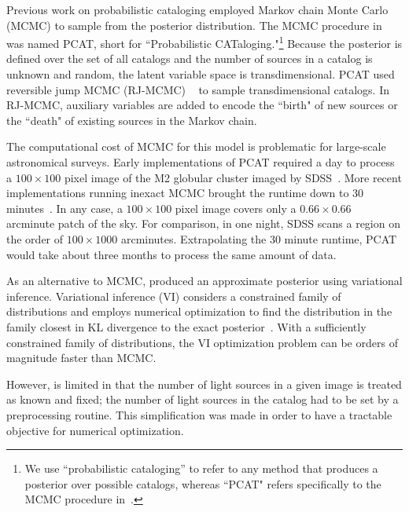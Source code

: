 Previous work on probabilistic cataloging employed Markov chain Monte Carlo (MCMC) to sample from the posterior distribution.
The MCMC procedure in~\cite{Portillo_2017, Feder_2019}
was named PCAT, short for ``Probabilistic CATaloging."\footnote{
We use ``probabilistic cataloging'' to refer to any method that produces a posterior over possible catalogs, whereas ``PCAT" refers specifically to the MCMC procedure in~\cite{Portillo_2017, Feder_2019}. }
Because the posterior is defined over the set of all catalogs and the number of sources in a catalog is unknown and random, 
the latent variable space is transdimensional. PCAT
used reversible jump MCMC (RJ-MCMC) ~\cite{Green95reversiblejump} to sample transdimensional catalogs. In RJ-MCMC, auxiliary variables are added to encode the ``birth" of new sources 
or the ``death" of existing sources in the Markov chain.

The computational cost of MCMC for this model is problematic for large-scale astronomical surveys. 
Early implementations of PCAT required a day to process a $100\times 100$ pixel image of the M2 globular cluster imaged by SDSS~\cite{Portillo_2017}. 
More recent implementations running inexact MCMC brought the runtime down to 30  minutes~\cite{Feder_2019}.  
In any case, a $100\times 100$ pixel image covers only a $0.66 \times 0.66$ arcminute patch of the sky.
For comparison, in one night, SDSS scans a region on the order of $100 \times 1000$ arcminutes. 
Extrapolating the 30 minute runtime, PCAT would take about three months to process the same amount of data.

As an alternative to MCMC, \cite{regier2019_celeste} produced an approximate posterior using variational inference.
Variational inference (VI) considers a constrained family of distributions and employs numerical optimization to find the distribution in the family closest
in KL divergence to the exact posterior~\cite{Blei_2017_vi_review,Jordan_intro_vi, Wainwrite_graph_models_vi}. 
With a sufficiently constrained family of distributions, the VI optimization problem can be orders of magnitude faster than MCMC. 

However, \cite{regier2019_celeste} is limited in that the number of light sources in a given image is treated as known and fixed; the number of light sources in the catalog had to be set by a preprocessing routine. 
This simplification was made in order to have a tractable objective for numerical optimization. 

\bigbreak



